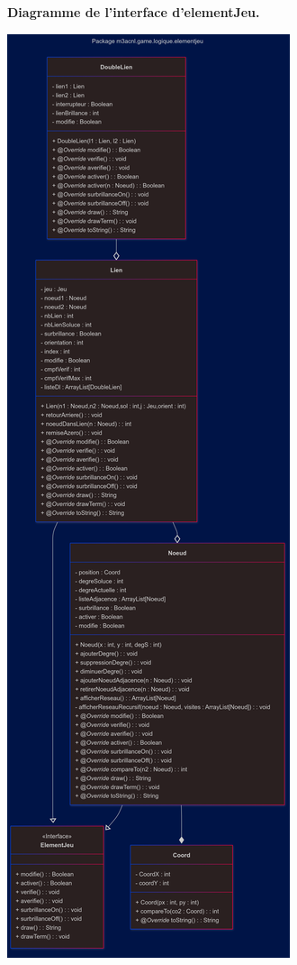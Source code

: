 \pagebreak

\textbf{Diagramme de l'interface d'elementJeu.}\\
\begin{center}
    \includegraphics[width=\textwidth,height=\dimexpr\textheight-40pt\relax,keepaspectratio]{../Annexe/classes/elementJeu.png}
\end{center}
